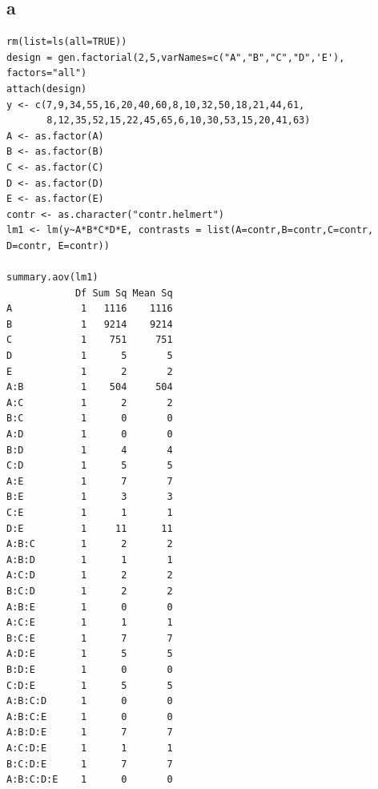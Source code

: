 \documentclass[11pt,letterpaper]{article}
\begin{document}
\subsection*{a}
\begin{verbatim}
rm(list=ls(all=TRUE))
design = gen.factorial(2,5,varNames=c("A","B","C","D",'E'), factors="all")
attach(design)
y <- c(7,9,34,55,16,20,40,60,8,10,32,50,18,21,44,61,
       8,12,35,52,15,22,45,65,6,10,30,53,15,20,41,63)
A <- as.factor(A)
B <- as.factor(B)
C <- as.factor(C)
D <- as.factor(D)
E <- as.factor(E)
contr <- as.character("contr.helmert")
lm1 <- lm(y~A*B*C*D*E, contrasts = list(A=contr,B=contr,C=contr, D=contr, E=contr))

summary.aov(lm1)
            Df Sum Sq Mean Sq
A            1   1116    1116
B            1   9214    9214
C            1    751     751
D            1      5       5
E            1      2       2
A:B          1    504     504
A:C          1      2       2
B:C          1      0       0
A:D          1      0       0
B:D          1      4       4
C:D          1      5       5
A:E          1      7       7
B:E          1      3       3
C:E          1      1       1
D:E          1     11      11
A:B:C        1      2       2
A:B:D        1      1       1
A:C:D        1      2       2
B:C:D        1      2       2
A:B:E        1      0       0
A:C:E        1      1       1
B:C:E        1      7       7
A:D:E        1      5       5
B:D:E        1      0       0
C:D:E        1      5       5
A:B:C:D      1      0       0
A:B:C:E      1      0       0
A:B:D:E      1      7       7
A:C:D:E      1      1       1
B:C:D:E      1      7       7
A:B:C:D:E    1      0       0
\end{verbatim}
\end{document}
